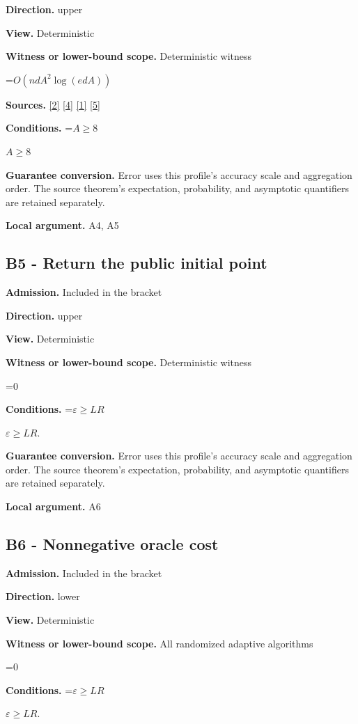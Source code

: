 \documentclass[10pt,a4paper]{article}
\newcommand{\AtlasMath}[1]{\par\begingroup\centering\setbox0=\hbox{$\displaystyle #1$}\ifdim\wd0>1.4\linewidth\typeout{ATLAS WIDE FORMULA: \the\wd0}\fi\ifdim\wd0>\linewidth\resizebox{\linewidth}{!}{\box0}\else\box0\fi\par\endgroup}
\newcommand{\AtlasInlineMath}[1]{\begingroup\setbox0=\hbox{$#1$}\ifdim\wd0>.4\linewidth\endgroup\AtlasMath{#1}\else\endgroup$#1$\fi}
\begin{document}
\textbf{Direction.} upper

\textbf{View.} Deterministic

\textbf{Witness or lower-bound scope.} Deterministic witness

\AtlasMath{O(ndA^2\log(edA))}
\textbf{Sources.} \href{https://arxiv.org/html/2607.16558v2}{[2]} \href{https://www.mathnet.ru/php/archive.phtml?jrnid=mzm&option_lang=eng&paperid=1697&wshow=paper}{[4]} \href{https://arxiv.org/html/2610.00345v1}{[1]} \href{https://arxiv.org/abs/2109.08858}{[5]}

\textbf{Conditions.} \AtlasInlineMath{A\ge8}

\textbf{Guarantee conversion.} Error uses this profile's accuracy scale and aggregation order. The source theorem's expectation, probability, and asymptotic quantifiers are retained separately.

\textbf{Local argument.} A4, A5

\subsection{B5 - Return the public initial point}
\textbf{Admission.} Included in the bracket

\textbf{Direction.} upper

\textbf{View.} Deterministic

\textbf{Witness or lower-bound scope.} Deterministic witness

\AtlasMath{0}
\textbf{Conditions.} \AtlasInlineMath{\varepsilon\ge LR}.

\textbf{Guarantee conversion.} Error uses this profile's accuracy scale and aggregation order. The source theorem's expectation, probability, and asymptotic quantifiers are retained separately.

\textbf{Local argument.} A6

\subsection{B6 - Nonnegative oracle cost}
\textbf{Admission.} Included in the bracket

\textbf{Direction.} lower

\textbf{View.} Deterministic

\textbf{Witness or lower-bound scope.} All randomized adaptive algorithms

\AtlasMath{0}
\textbf{Conditions.} \AtlasInlineMath{\varepsilon\ge LR}.
\end{document}
